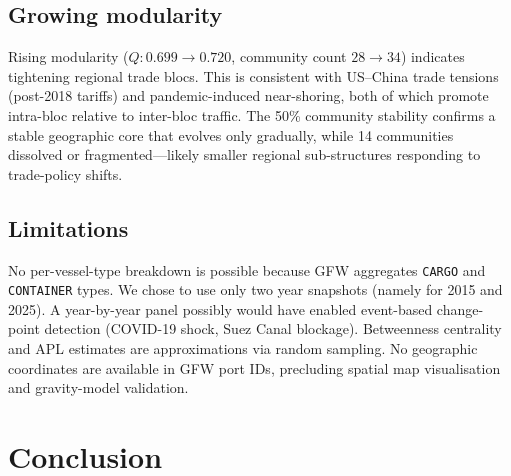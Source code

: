 \documentclass[a4paper,10pt,twocolumn]{article}
\begin{document}
\subsection{Growing modularity}

Rising modularity ($Q: 0.699\to0.720$, community count $28\to34$)
indicates tightening regional trade blocs.
This is consistent with US--China trade tensions (post-2018 tariffs)
and pandemic-induced near-shoring, both of which promote
intra-bloc relative to inter-bloc traffic.
The 50\% community stability confirms a stable geographic core
that evolves only gradually, while 14 communities dissolved or
fragmented---likely smaller regional sub-structures responding to
trade-policy shifts.

\subsection{Limitations}

No per-vessel-type breakdown is possible because GFW aggregates
\texttt{CARGO} and \texttt{CONTAINER} types.
We chose to use only two year snapshots (namely for 2015 and 2025). A year-by-year panel possibly would have
enabled event-based change-point detection (COVID-19 shock,
Suez Canal blockage).
Betweenness centrality and APL estimates are approximations via
random sampling.
No geographic coordinates are available in GFW port IDs,
precluding spatial map visualisation and gravity-model validation.

\section{Conclusion}
\end{document}
